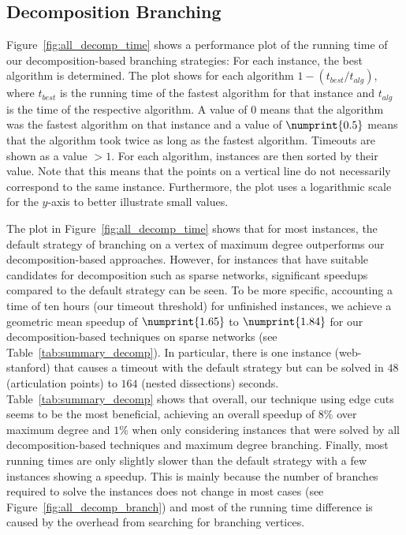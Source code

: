 \documentclass[a4paper,UKenglish,cleveref, autoref, thm-restate]{lipics-v2021}
\begin{document}
\subsection{Decomposition Branching}\label{sec:experiments_decomp}

Figure~\ref{fig:all_decomp_time} shows a performance plot of the running time of
our decomposition-based branching strategies: For each instance, the best
algorithm is determined. The plot shows for each algorithm $1 - (t_{best}/
t_{alg})$, where $t_{best}$ is the running time of the fastest algorithm
for that instance and $t_{alg}$ is the time of the respective algorithm.
A value of $0$ means that
the algorithm was the fastest algorithm on that instance and a value of
$\numprint{0.5}$ means that the algorithm took twice as long as the fastest
algorithm. Timeouts are shown as a value $> 1$. For each algorithm, instances
are then sorted by their value. Note that this means that the points on a
vertical line do not necessarily correspond to the same instance. Furthermore,
the plot uses a logarithmic scale for the $y$-axis to better illustrate small values.

The plot in Figure~\ref{fig:all_decomp_time} shows that for most instances, the default strategy of branching on a
vertex of maximum degree outperforms our decomposition-based approaches.
However, for instances that have suitable candidates for decomposition such as
sparse networks, significant speedups compared to the default strategy can be
seen. To be more specific, accounting a time of ten hours (our timeout threshold) for unfinished
instances, we achieve a geometric
mean speedup of $\numprint{1.65}$ to $\numprint{1.84}$ for our
decomposition-based techniques on sparse networks (see
Table~\ref{tab:summary_decomp}). In particular, there is one instance (web-stanford) that causes a timeout with the
default strategy but can be solved in $48$ (articulation points) to $164$ (nested
dissections) seconds. Table~\ref{tab:summary_decomp} shows that overall, our
technique using edge cuts seems to be the most beneficial, achieving an overall speedup of $8\%$ over maximum degree and $1\%$
when only considering instances that were solved by all decomposition-based
techniques and maximum degree branching.
Finally, most running
times are only slightly slower than the default strategy with a few instances
showing a speedup. This is mainly because
the number of branches required to solve the instances does not change in most
cases (see Figure~\ref{fig:all_decomp_branch}) and most of the running time
difference is caused by the overhead from
searching for branching vertices.
\end{document}
